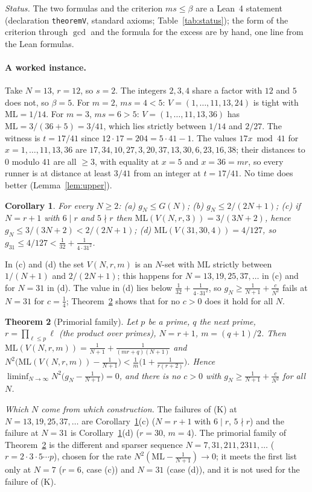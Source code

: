 \documentclass[11pt]{article}
\newtheorem{theorem}{Theorem}[section]
\newtheorem{corollary}[theorem]{Corollary}
\theoremstyle{definition}
\theoremstyle{remark}
\newcommand{\ML}{\mathrm{ML}}
\begin{document}
\emph{Status.} The two formulas and the criterion $ms\le\beta$ are a Lean~4 statement (declaration \texttt{theoremV}, standard axioms; Table~\ref{tab:status}); the form of the criterion through $\gcd$ and the formula for the excess are by hand, one line from the Lean formulas.

\paragraph{A worked instance.}
Take $N=13$, $r=12$, so $s=2$. The integers $2,3,4$ share a factor with $12$ and $5$ does not, so $\beta=5$. For $m=2$, $ms=4<5$: $V=(1,\dots,11,13,24)$ is tight with $\ML=1/14$. For $m=3$, $ms=6>5$: $V=(1,\dots,11,13,36)$ has $\ML=3/(36+5)=3/41$, which lies strictly between $1/14$ and $2/27$. The witness is $t=17/41$ since $12\cdot17=204=5\cdot41-1$. The values $17x\bmod41$ for $x=1,\dots,11,13,36$ are $17,34,10,27,3,20,37,13,30,6,23,16,38$; their distances to $0$ modulo $41$ are all $\ge3$, with equality at $x=5$ and $x=36=mr$, so every runner is at distance at least $3/41$ from an integer at $t=17/41$. No time does better (Lemma~\ref{lem:upper}).

\begin{corollary}\label{cor:A}
For every $N\ge2$: (a) $g_N\le G(N)$; (b) $g_N\le 2/(2N+1)$; (c) if $N=r+1$ with $6\mid r$ and $5\nmid r$ then $\ML(V(N,r,3))=3/(3N+2)$, hence $g_N\le3/(3N+2)<2/(2N+1)$; (d) $\ML(V(31,30,4))=4/127$, so $g_{31}\le4/127<\frac1{32}+\frac1{4\cdot31^2}$.
\end{corollary}
In (c) and (d) the set $V(N,r,m)$ is an $N$-set with $\ML$ strictly between $1/(N+1)$ and $2/(2N+1)$; this happens for $N=13,19,25,37,\dots$ in (c) and for $N=31$ in (d). The value in (d) lies below $\frac1{32}+\frac1{4\cdot31^2}$, so $g_N\ge\frac1{N+1}+\frac c{N^2}$ fails at $N=31$ for $c=\frac14$; Theorem~\ref{thm:C} shows that for no $c>0$ does it hold for all $N$.

\begin{theorem}[Primorial family]\label{thm:C}
Let $p$ be a prime, $q$ the next prime, $r=\prod_{\ell\le p}\ell$ (the product over primes), $N=r+1$, $m=(q+1)/2$. Then $\ML(V(N,r,m))=\frac1{N+1}+\frac1{(mr+q)(N+1)}$ and $N^2\bigl(\ML(V(N,r,m))-\frac1{N+1}\bigr)<\frac1m\bigl(1+\frac1{r(r+2)}\bigr)$. Hence $\liminf_{N\to\infty}N^2\bigl(g_N-\frac1{N+1}\bigr)=0$, and there is no $c>0$ with $g_N\ge\frac1{N+1}+\frac c{N^2}$ for all $N$.
\end{theorem}

\emph{Which $N$ come from which construction.} The failures of (K) at $N=13,19,25,37,\dots$ are Corollary~\ref{cor:A}(c) ($N=r+1$ with $6\mid r$, $5\nmid r$) and the failure at $N=31$ is Corollary~\ref{cor:A}(d) ($r=30$, $m=4$). The primorial family of Theorem~\ref{thm:C} is the different and sparser sequence $N=7,31,211,2311,\dots$ ($r=2\cdot3\cdot5\cdots p$), chosen for the rate $N^2(\ML-\frac1{N+1})\to0$; it meets the first list only at $N=7$ ($r=6$, case (c)) and $N=31$ (case (d)), and it is not used for the failure of (K).
\end{document}
